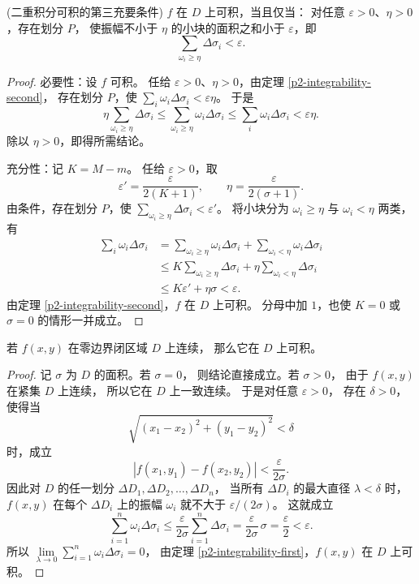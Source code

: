 \begin{theorem}(二重积分可积的第三充要条件)\label{p2-integrability-third}
$f$ 在 $D$ 上可积，当且仅当：
对任意 $\varepsilon>0$、$\eta>0$，存在划分 $P$，
使振幅不小于 $\eta$ 的小块的面积之和小于 $\varepsilon$，即
\[
\sum_{\omega_i\ge\eta}\Delta\sigma_i<\varepsilon.
\]
\end{theorem}
\begin{proof}
必要性：设 $f$ 可积。
任给 $\varepsilon>0$、$\eta>0$，由定理 \ref{p2-integrability-second}，
存在划分 $P$，使 $\sum_i\omega_i\Delta\sigma_i<\varepsilon\eta$。
于是
\[
\eta\sum_{\omega_i\ge\eta}\Delta\sigma_i
\le\sum_{\omega_i\ge\eta}\omega_i\Delta\sigma_i
\le\sum_i\omega_i\Delta\sigma_i<\varepsilon\eta.
\]
除以 $\eta>0$，即得所需结论。

充分性：记 $K=M-m$。
任给 $\varepsilon>0$，取
\[
\varepsilon'=\frac{\varepsilon}{2(K+1)},\qquad
\eta=\frac{\varepsilon}{2(\sigma+1)}.
\]
由条件，存在划分 $P$，使
$\sum_{\omega_i\ge\eta}\Delta\sigma_i<\varepsilon'$。
将小块分为 $\omega_i\ge\eta$ 与 $\omega_i<\eta$ 两类，有
\[
\begin{aligned}
\sum_i\omega_i\Delta\sigma_i
&=\sum_{\omega_i\ge\eta}\omega_i\Delta\sigma_i
+\sum_{\omega_i<\eta}\omega_i\Delta\sigma_i\\
&\le K\sum_{\omega_i\ge\eta}\Delta\sigma_i
+\eta\sum_{\omega_i<\eta}\Delta\sigma_i\\
&\le K\varepsilon'+\eta\sigma
<\varepsilon.
\end{aligned}
\]
由定理 \ref{p2-integrability-second}，$f$ 在 $D$ 上可积。
分母中加 $1$，也使 $K=0$ 或 $\sigma=0$ 的情形一并成立。
\end{proof}

\begin{proposition}\label{p2-continuous-integrability}
若 $f(x,y)$ 在零边界闭区域 $D$ 上连续，
那么它在 $D$ 上可积。
\end{proposition}
\begin{proof}
记 $\sigma$ 为 $D$ 的面积。若 $\sigma=0$，
则结论直接成立。若 $\sigma>0$，
由于 $f(x,y)$ 在紧集 $D$ 上连续，
所以它在 $D$ 上一致连续。
于是对任意 $\varepsilon>0$，
存在 $\delta>0$，使得当
\[
\sqrt{(x_1-x_2)^2+(y_1-y_2)^2}<\delta
\]
时，成立
\[
|f(x_1,y_1)-f(x_2,y_2)|<\frac{\varepsilon}{2\sigma}.
\]
因此对 $D$ 的任一划分
$\Delta D_1,\Delta D_2,\ldots,\Delta D_n$，
当所有 $\Delta D_i$ 的最大直径 $\lambda<\delta$ 时，
$f(x,y)$ 在每个 $\Delta D_i$ 上的振幅
$\omega_i$ 就不大于 $\varepsilon/(2\sigma)$。
这就成立
\[
\sum_{i=1}^n\omega_i\Delta\sigma_i
\le\frac{\varepsilon}{2\sigma}
\sum_{i=1}^n\Delta\sigma_i
=\frac{\varepsilon}{2\sigma}\,\sigma
=\frac{\varepsilon}{2}<\varepsilon.
\]
所以
$\lim\limits_{\lambda\to0}\sum_{i=1}^n\omega_i\Delta\sigma_i=0$，
由定理 \ref{p2-integrability-first}，$f(x,y)$ 在 $D$ 上可积。
\end{proof}

